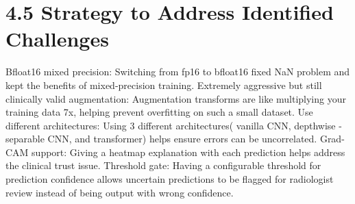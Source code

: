 \documentclass[12pt,a4paper,oneside]{report}
\begin{document}
\section*{4.5 Strategy to Address Identified Challenges}
Bfloat16 mixed precision: Switching from fp16 to bfloat16 fixed NaN problem and kept the benefits of mixed-precision training.
Extremely aggressive but still clinically valid augmentation: Augmentation transforms are like multiplying your training data 7x, helping prevent overfitting on such a small dataset.
Use different architectures: Using 3 different architectures( vanilla CNN, depthwise - separable CNN, and transformer) helps ensure errors can be uncorrelated.
Grad-CAM support: Giving a heatmap explanation with each prediction helps address the clinical trust issue.
Threshold gate: Having a configurable threshold for prediction confidence allows uncertain predictions to be flagged for radiologist review instead of being output with wrong confidence. 
\end{document}
